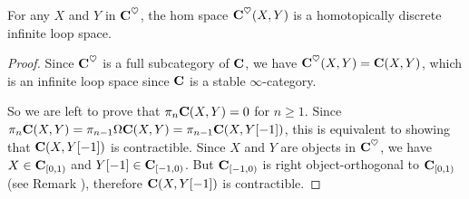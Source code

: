 \begin{lemma}
For any $X$ and $Y$ in $\textbf{C}^\heartsuit$, the hom space $\textbf{C}^\heartsuit(X,Y)$ is a homotopically discrete infinite loop space.
\end{lemma}
\begin{proof}
Since $\textbf{C}^\heartsuit$ is a full subcategory of $\textbf{C}$, we have $\textbf{C}^\heartsuit(X,Y)=\textbf{C}(X,Y)$, which is an infinite loop space since $\textbf{C}$ is a stable $\infty$\hyp{}category. 

So we are left to prove that $\pi_n\textbf{C}(X,Y)=0$ for $n\geq 1$. Since $\pi_n\textbf{C}(X,Y)=\pi_{n-1}\Omega\textbf{C}(X,Y)=\pi_{n-1}\textbf{C}(X,Y[-1])$, this is equivalent to showing that 
$\textbf{C}(X,Y[-1])$ is contractible. Since $X$ and $Y$ are objects in $\textbf{C}^\heartsuit$, we have $X\in \textbf{C}_{[0,1)}$ and $Y[-1]\in \textbf{C}_{[-1,0)}$. But $\textbf{C}_{[-1,0)}$ is right object\hyp{}orthogonal to $\textbf{C}_{[0,1)}$ (see Remark ), therefore $\textbf{C}(X,Y[-1])$ is contractible.
\end{proof}

